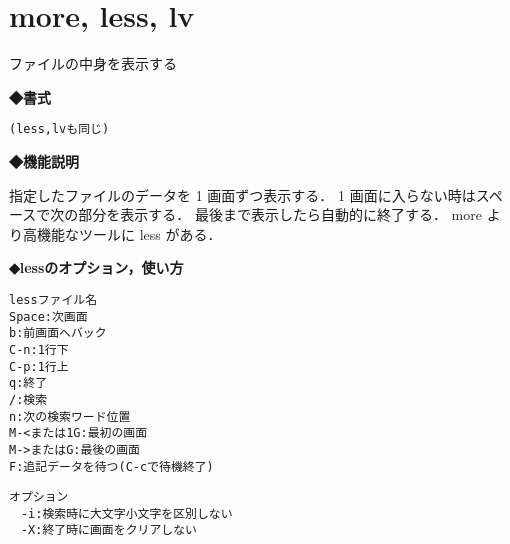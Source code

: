 
\section{more, less, lv}
ファイルの中身を表示する\par
\label{cmd:more}
\noindent
{\bf ◆書式}
\begin{center}
\begin{screen}
\begin{alltt}
% more ファイル名
(less, lv も同じ)
\end{alltt}
\end{screen}
\end{center}

\noindent
{\bf ◆機能説明}

指定したファイルのデータを 1 画面ずつ表示する．
1 画面に入らない時はスペースで次の部分を表示する．
最後まで表示したら自動的に終了する．
more より高機能なツールに less がある．

{\bf ◆lessのオプション，使い方}
\begin{center}
\begin{screen}
\begin{alltt}
less ファイル名
  Space: 次画面
  b : 前画面へバック
  C-n: 1行下
  C-p: 1行上
  q: 終了
  / : 検索
    n : 次の検索ワード位置
  M-< または 1 G : 最初の画面
  M-> または G : 最後の画面
  F : 追記データを待つ (C-c で待機終了)

オプション
　-i : 検索時に大文字小文字を区別しない
　-X : 終了時に画面をクリアしない
\end{alltt}
\end{screen}
\end{center}



